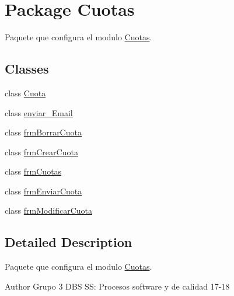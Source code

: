 \hypertarget{namespace_cuotas}{}\section{Package Cuotas}
\label{namespace_cuotas}


Paquete que configura el modulo \hyperlink{namespace_cuotas}{Cuotas}.  


\subsection*{Classes}
\begin{DoxyCompactItemize}
\item 
class \hyperlink{class_cuotas_1_1_cuota}{Cuota}
\item 
class \hyperlink{class_cuotas_1_1enviar___email}{enviar\+\_\+\+Email}
\item 
class \hyperlink{class_cuotas_1_1frm_borrar_cuota}{frm\+Borrar\+Cuota}
\item 
class \hyperlink{class_cuotas_1_1frm_crear_cuota}{frm\+Crear\+Cuota}
\item 
class \hyperlink{class_cuotas_1_1frm_cuotas}{frm\+Cuotas}
\item 
class \hyperlink{class_cuotas_1_1frm_enviar_cuota}{frm\+Enviar\+Cuota}
\item 
class \hyperlink{class_cuotas_1_1frm_modificar_cuota}{frm\+Modificar\+Cuota}
\end{DoxyCompactItemize}


\subsection{Detailed Description}
Paquete que configura el modulo \hyperlink{namespace_cuotas}{Cuotas}. 

\begin{DoxyAuthor}{Author}
Grupo 3 D\+BS SS\+: Procesos software y de calidad 17-\/18 
\end{DoxyAuthor}
